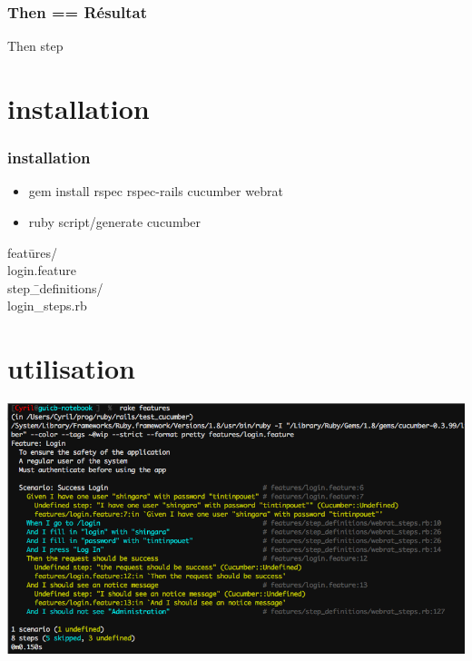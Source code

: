 \documentclass{beamer}
\begin{document}
\begin{frame}
  \frametitle{Then == R\'esultat}
  \begin{beamerboxesrounded}{Then step}
    
  \end{beamerboxesrounded}
\end{frame}

\section{installation}

\begin{frame}
  \frametitle{installation}
  \begin{itemize}
    \item gem install rspec rspec-rails cucumber webrat
    \item ruby script/generate cucumber
  \end{itemize}
\end{frame}

\begin{frame}
  \begin{tabbing}
    feat\=ures/ \\
    \> login.feature \\
    \> step\=\_definitions/ \\
    \> \> login\_steps.rb \\
  \end{tabbing}
\end{frame}

\section{utilisation}

\begin{frame}
  \includegraphics[scale=.4]{features_with_step_undefined}
\end{frame}
\end{document}
